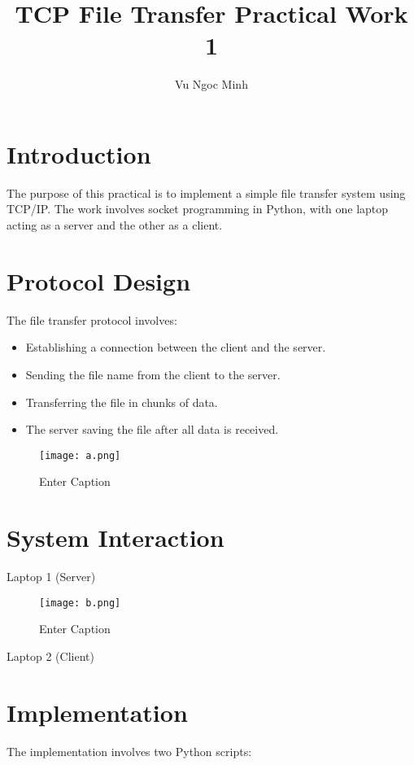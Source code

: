 \documentclass{article}
\title{TCP File Transfer Practical Work 1}
\author{Vu Ngoc Minh}
\date{}
\begin{document}
\maketitle

\section{Introduction}
The purpose of this practical is to implement a simple file transfer system using TCP/IP. The work involves socket programming in Python, with one laptop acting as a server and the other as a client.

\section{Protocol Design}
The file transfer protocol involves:
\begin{itemize}
    \item Establishing a connection between the client and the server.
    \item Sending the file name from the client to the server.
    \item Transferring the file in chunks of data.
    \item The server saving the file after all data is received.
\end{itemize}
\begin{figure}
    \centering
    \texttt{[image: a.png]}
    \caption{Enter Caption}
    \label{fig:enter-label}
\end{figure}
\section{System Interaction}


\begin{center}
Laptop 1 (Server)
\end{center}

\begin{figure}
    \centering
    \texttt{[image: b.png]}
    \caption{Enter Caption}
    \label{fig:enter-label}
\end{figure}

\begin{center}
Laptop 2 (Client)
\end{center}
                                
\section{Implementation}
The implementation involves two Python scripts:
\end{document}
